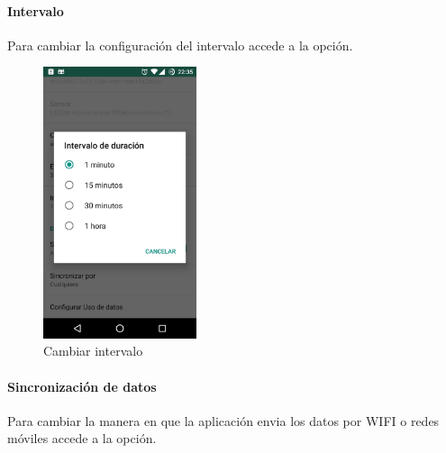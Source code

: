 {\paragraph{Intervalo}
\label{config_adic:intervalo}
Para cambiar la configuración del intervalo accede a la opción.
\begin{figure}[!htbp]
    \centering
    \includegraphics[width=0.4\textwidth]{anexos/graphics/conf_int.jpg}
\caption{Cambiar intervalo}\label{config_adic:id3}\end{figure}


\paragraph{Sincronización de datos}
\label{config_adic:sincronizacion-de-datos}
Para cambiar la manera en que la aplicación envia los datos por WIFI o redes móviles accede a la opción.

}
